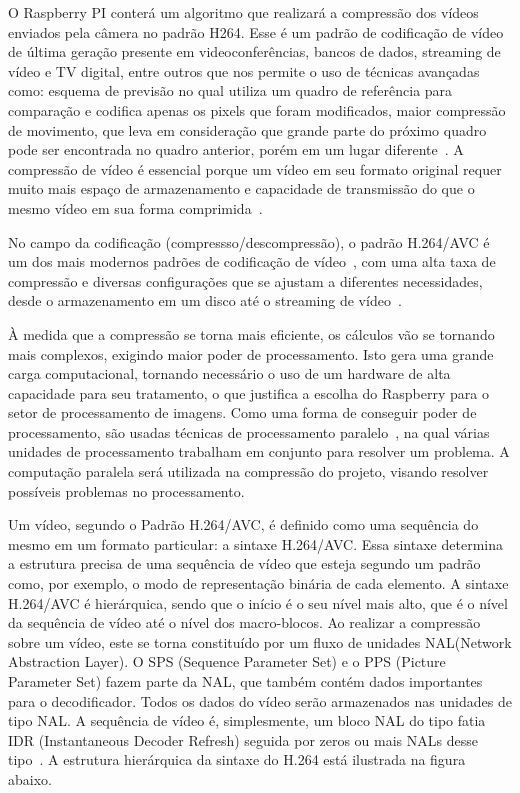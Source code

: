 		O Raspberry PI conterá um algoritmo que realizará a compressão dos vídeos enviados pela câmera no padrão H264.		Esse é um padrão de codificação de vídeo de última geração presente em videoconferências, bancos de dados, streaming de vídeo e TV digital, entre outros que nos permite o uso de técnicas avançadas como: esquema de previsão no qual utiliza um quadro de referência para comparação e codifica apenas os pixels que foram modificados, maior compressão de movimento, que leva em consideração que grande parte do próximo quadro pode ser encontrada no quadro anterior, porém em um lugar diferente~\cite{axis}. A compressão de vídeo é essencial porque um vídeo em seu formato original requer muito mais espaço de armazenamento e capacidade de transmissão do que o mesmo vídeo em sua forma comprimida~\cite{ostermann}.

		No campo da codificação (compressso/descompressão), o padrão H.264/AVC é um dos mais modernos padrões de codificação de vídeo~\cite{sullîvan}, com uma alta taxa de compressão e diversas configurações que se ajustam a diferentes necessidades, desde o armazenamento em um disco até o streaming de vídeo~\cite{wiegard}.

		À medida que a compressão se torna mais eficiente, os cálculos vão se tornando mais complexos, exigindo maior poder de processamento. Isto gera uma grande carga computacional, tornando necessário o uso de um hardware de alta capacidade para seu tratamento, o que justifica a escolha do Raspberry para o setor de processamento de imagens. Como uma forma de conseguir poder de processamento, são usadas técnicas de processamento paralelo~\cite{mattson}, na qual várias unidades de processamento trabalham em conjunto para resolver um problema. A computação paralela será utilizada na compressão do projeto, visando resolver possíveis problemas no processamento.

		Um vídeo, segundo o Padrão H.264/AVC, é definido como uma sequência do mesmo em um formato particular: a sintaxe H.264/AVC. Essa sintaxe determina a estrutura precisa de uma sequência de vídeo que esteja segundo um padrão como, por exemplo, o modo de representação binária de cada elemento. A sintaxe H.264/AVC é hierárquica, sendo que o início é o seu nível mais alto, que é o nível da sequência de vídeo até o nível dos macro-blocos. Ao realizar a compressão sobre um vídeo, este se torna constituído por um fluxo de unidades NAL(Network Abstraction Layer). O SPS (Sequence Parameter Set) e o PPS (Picture Parameter Set) fazem parte da NAL, que também contém dados importantes para o decodificador. Todos os dados do vídeo serão armazenados nas unidades de tipo NAL. A sequência de vídeo é, simplesmente, um bloco NAL do tipo fatia IDR (Instantaneous Decoder Refresh) seguida por zeros ou mais NALs desse tipo~\cite{morais}. A estrutura hierárquica da sintaxe do H.264 está ilustrada na figura abaixo.

